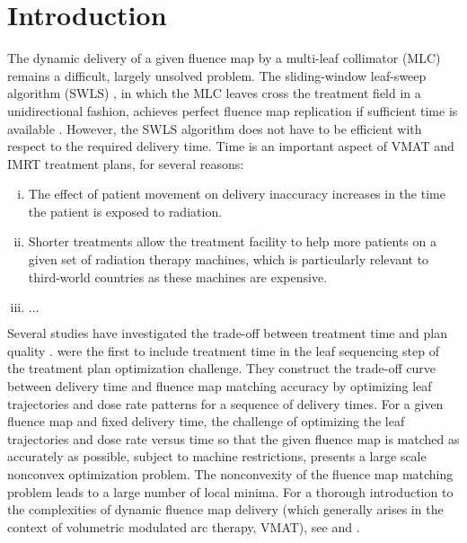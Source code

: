 \section{Introduction}
The dynamic delivery of a given fluence map by a multi-leaf collimator (MLC) remains a difficult, largely unsolved problem.
The sliding-window leaf-sweep algorithm (SWLS) \cite{leafsweep}, 
    in which the MLC leaves cross the treatment field in a unidirectional fashion, 
    achieves perfect fluence map replication if sufficient time is available \cite{Stein94}.
However, the SWLS algorithm does not have to be efficient with respect to the required delivery time.
Time is an important aspect of VMAT and IMRT treatment plans, for several reasons:
\begin{enumerate}[i)]
  \item The effect of patient movement on delivery inaccuracy increases in the time the patient is exposed to radiation.
  \item Shorter treatments allow the treatment facility to help more patients on a given set of radiation therapy machines, 
        which is particularly relevant to third-world countries as these machines are expensive.
  \item $\hdots$
\end{enumerate}
Several studies have investigated the trade-off between treatment time and plan quality \cite{tradeoffSalari,tradeoffMCO,tradeoffCraft}.
\cite{balvertcraft} were the first to include treatment time in the leaf sequencing step of the treatment plan optimization challenge.
They construct the trade-off curve between delivery time and fluence map matching accuracy by optimizing leaf trajectories and dose rate patterns for a sequence of delivery times.
For a given fluence map and fixed delivery time, the challenge of optimizing the leaf trajectories and dose rate versus time so that the given fluence map is matched as accurately as possible, subject to machine restrictions, presents a large scale nonconvex optimization problem.
The nonconvexity of the fluence map matching problem leads to a large number of local minima.
For a thorough introduction to the complexities of dynamic fluence map delivery (which generally arises in the context of volumetric modulated arc therapy, VMAT),
 see \cite{balvertcraft} and \cite{unkvmatreview}.


